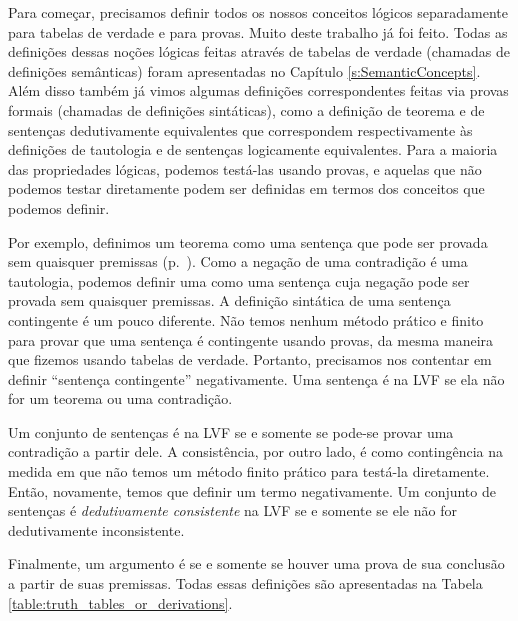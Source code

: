 Para começar, precisamos definir todos os nossos conceitos lógicos separadamente para tabelas de verdade e  para provas. Muito deste trabalho já foi feito. 
Todas as definições dessas noções lógicas feitas através de tabelas de verdade (chamadas de definições semânticas) foram apresentadas no  Capítulo \ref{s:SemanticConcepts}. Além disso também já vimos algumas definições correspondentes feitas via provas formais (chamadas de definições sintáticas), como a definição de teorema e de sentenças dedutivamente equivalentes que correspondem respectivamente às definições de tautologia e de sentenças logicamente equivalentes.
Para a maioria das propriedades lógicas, podemos testá-las usando provas, e aquelas que não podemos testar diretamente podem ser definidas em termos dos conceitos que podemos definir.

Por exemplo, definimos um teorema como uma sentença que pode ser provada sem quaisquer premissas (p.~\pageref{def:syntactic_tautology_in_sl}). Como a negação de uma contradição é uma tautologia, podemos definir uma  \label{def:syntactic_contradiction_in_sl} como uma sentença cuja negação pode ser provada sem quaisquer premissas. A definição sintática de uma sentença contingente é um pouco diferente. Não temos nenhum método prático e finito para provar que uma sentença é contingente usando provas, da mesma maneira que fizemos usando tabelas de verdade. Portanto, precisamos nos contentar em definir ``sentença contingente'' negativamente. Uma sentença é  \label{def:syntactically_contingent_in_sl} na LVF se ela  não for um teorema ou uma contradição. 
 

Um  conjunto de sentenças é  na LVF \label{def:syntactically_inconsistent_ in_sl}  se e somente se pode-se provar uma contradição a partir dele. A consistência, por outro lado, é como contingência na medida em que não temos um método finito prático para testá-la diretamente. Então, novamente, temos que definir um termo negativamente. Um  conjunto de sentenças é \textit{dedutivamente consistente} na LVF\label{def:syntactically consistent in SL} se e somente se ele não for dedutivamente inconsistente.
    
Finalmente, um argumento é   \label{def:syntactically_valid_in_SL}se e somente se houver uma prova de sua conclusão a partir de suas premissas. Todas essas definições são apresentadas na Tabela \ref{table:truth_tables_or_derivations}.


